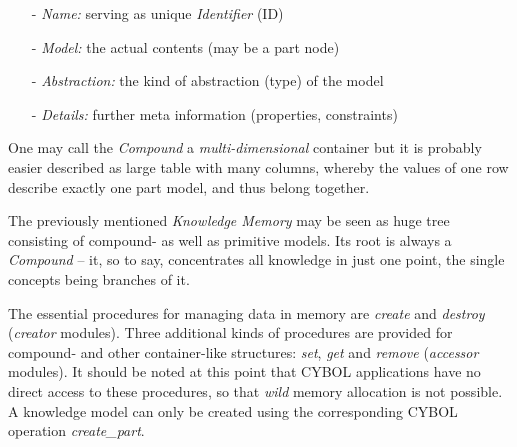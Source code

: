 \begin{itemize}
    \item[-] \emph{Name:} serving as unique \emph{Identifier} (ID)
    \item[-] \emph{Model:} the actual contents (may be a part node)
    \item[-] \emph{Abstraction:} the kind of abstraction (type) of the model
    \item[-] \emph{Details:} further meta information (properties, constraints)
\end{itemize}

One may call the \emph{Compound} a \emph{multi-dimensional} container but it is
probably easier described as large table with many columns, whereby the values
of one row describe exactly one part model, and thus belong together.

The previously mentioned \emph{Knowledge Memory} may be seen as huge tree
consisting of compound- as well as primitive models. Its root is always a
\emph{Compound} -- it, so to say, concentrates all knowledge in just one point,
the single concepts being branches of it.

The essential procedures for managing data in memory are \emph{create} and
\emph{destroy} (\emph{creator} modules). Three additional kinds of procedures
are provided for compound- and other container-like structures: \emph{set},
\emph{get} and \emph{remove} (\emph{accessor} modules). It should be noted at
this point that CYBOL applications have no direct access to these procedures,
so that \emph{wild} memory allocation is not possible. A knowledge model can
only be created using the corresponding CYBOL operation \emph{create\_part}.
